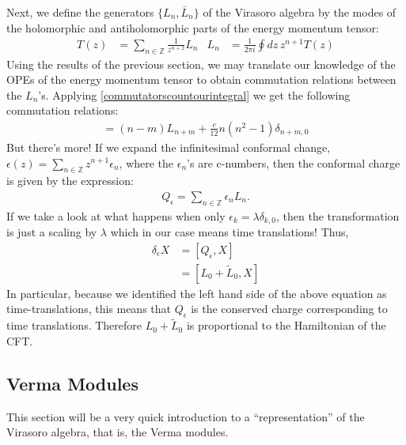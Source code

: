 \documentclass{report}
\theoremstyle{plain}
\theoremstyle{definition}
\theoremstyle{remark}
\newcommand{\FR}[2]{\frac{#1}{#2}}
\newcommand{\bZ}{\mathbb{Z}}
\begin{document}
Next, we define the generators $\{L_n,\bar L_n\}$ of the Virasoro algebra
by the modes of the holomorphic and antiholomorphic parts of the energy
momentum tensor:
\begin{align*}
T(z) &= \sum_{n\in\bZ} \FR{1}{z^{n+2}} L_n &
L_n  &= \FR{1}{2\pi i} \oint dz\, z^{n+1}T(z)
\end{align*}
Using the results of the previous section, we may translate our knowledge
of the OPEs of the energy momentum tensor to obtain commutation relations
between the $L_n$'s. Applying \eqref{commutatorscountourintegral} we get
the following commutation relations:
\begin{align}
    [L_n,L_m] = (n-m)L_{n+m} + \FR{c}{12}n(n^2-1)\delta_{n+m,0}
    \label{VirasoroCommutationRelations}
\end{align}
But there's more! If we expand the infinitesimal conformal change,
$\epsilon(z) = \sum_{n\in\bZ} z^{n+1}\epsilon_n$, where the $\epsilon_n$'s
are c-numbers, then the conformal charge is given by the expression:
\begin{align}
    Q_\epsilon = \sum_{n\in\bZ} \epsilon_n L_n.
\end{align}
If we take a look at what happens when only $\epsilon_k = \lambda\delta_{k,0}$,
then the transformation is just a scaling by $\lambda$ which in our case
means time translations! Thus,
\begin{align}
    \delta_\epsilon X &= [Q_\epsilon,X]\\
    &= [L_0+\tilde L_0,X]
\end{align}
In particular, because we identified the left hand side of the above
equation as time-translations, this means that $Q_\epsilon$ is the
conserved charge corresponding to time translations. Therefore $L_0+\tilde
L_0$ is proportional to the Hamiltonian of the CFT.

\subsection{Verma Modules}
This section will be a very quick introduction to a ``representation'' of
the Virasoro algebra, that is, the Verma modules.
\end{document}
